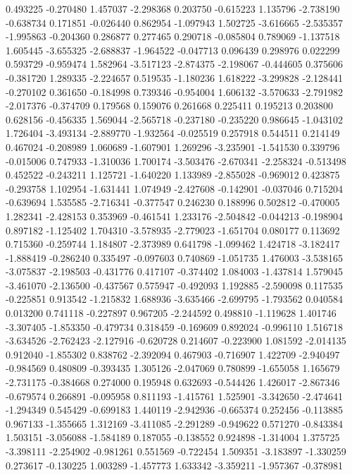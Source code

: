 0.493225
-0.270480
1.457037
-2.298368
0.203750
-0.615223
1.135796
-2.738190
-0.638734
0.171851
-0.026440
0.862954
-1.097943
1.502725
-3.616665
-2.535357
-1.995863
-0.204360
0.286877
0.277465
0.290718
-0.085804
0.789069
-1.137518
1.605445
-3.655325
-2.688837
-1.964522
-0.047713
0.096439
0.298976
0.022299
0.593729
-0.959474
1.582964
-3.517123
-2.874375
-2.198067
-0.444605
0.375606
-0.381720
1.289335
-2.224657
0.519535
-1.180236
1.618222
-3.299828
-2.128441
-0.270102
0.361650
-0.184998
0.739346
-0.954004
1.606132
-3.570633
-2.791982
-2.017376
-0.374709
0.179568
0.159076
0.261668
0.225411
0.195213
0.203800
0.628156
-0.456335
1.569044
-2.565718
-0.237180
-0.235220
0.986645
-1.043102
1.726404
-3.493134
-2.889770
-1.932564
-0.025519
0.257918
0.544511
0.214149
0.467024
-0.208989
1.060689
-1.607901
1.269296
-3.235901
-1.541530
0.339796
-0.015006
0.747933
-1.310036
1.700174
-3.503476
-2.670341
-2.258324
-0.513498
0.452522
-0.243211
1.125721
-1.640220
1.133989
-2.855028
-0.969012
0.423875
-0.293758
1.102954
-1.631441
1.074949
-2.427608
-0.142901
-0.037046
0.715204
-0.639694
1.535585
-2.716341
-0.377547
0.246230
0.188996
0.502812
-0.470005
1.282341
-2.428153
0.353969
-0.461541
1.233176
-2.504842
-0.044213
-0.198904
0.897182
-1.125402
1.704310
-3.578935
-2.779023
-1.651704
0.080177
0.113692
0.715360
-0.259744
1.184807
-2.373989
0.641798
-1.099462
1.424718
-3.182417
-1.888419
-0.286240
0.335497
-0.097603
0.740869
-1.051735
1.476003
-3.538165
-3.075837
-2.198503
-0.431776
0.417107
-0.374402
1.084003
-1.437814
1.579045
-3.461070
-2.136500
-0.437567
0.575947
-0.492093
1.192885
-2.590098
0.117535
-0.225851
0.913542
-1.215832
1.688936
-3.635466
-2.699795
-1.793562
0.040584
0.013200
0.741118
-0.227897
0.967205
-2.244592
0.498810
-1.119628
1.401746
-3.307405
-1.853350
-0.479734
0.318459
-0.169609
0.892024
-0.996110
1.516718
-3.634526
-2.762423
-2.127916
-0.620728
0.214607
-0.223900
1.081592
-2.014135
0.912040
-1.855302
0.838762
-2.392094
0.467903
-0.716907
1.422709
-2.940497
-0.984569
0.480809
-0.393435
1.305126
-2.047069
0.780899
-1.655058
1.165679
-2.731175
-0.384668
0.274000
0.195948
0.632693
-0.544426
1.426017
-2.867346
-0.679574
0.266891
-0.095958
0.811193
-1.415761
1.525901
-3.342650
-2.474641
-1.294349
0.545429
-0.699183
1.440119
-2.942936
-0.665374
0.252456
-0.113885
0.967133
-1.355665
1.312169
-3.411085
-2.291289
-0.949622
0.571270
-0.843384
1.503151
-3.056088
-1.584189
0.187055
-0.138552
0.924898
-1.314004
1.375725
-3.398111
-2.254902
-0.981261
0.551569
-0.722454
1.509351
-3.183897
-1.330259
0.273617
-0.130225
1.003289
-1.457773
1.633342
-3.359211
-1.957367
-0.378981

